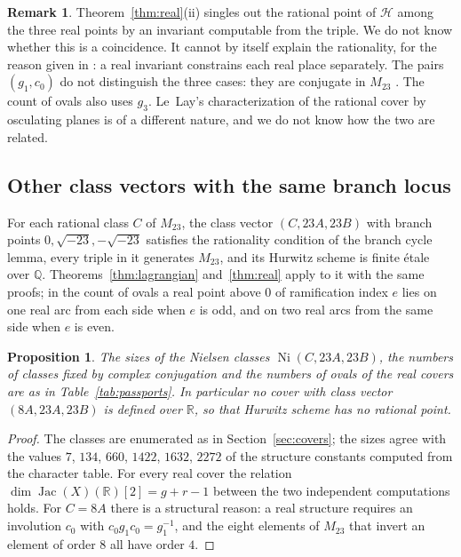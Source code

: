 \documentclass[11pt]{amsart}
\newtheorem{proposition}[theorem]{Proposition}
\theoremstyle{definition}
\newtheorem{remark}[theorem]{Remark}
\newcommand{\QQ}{\mathbb{Q}}
\newcommand{\RR}{\mathbb{R}}
\newcommand{\Jac}{\operatorname{Jac}}
\newcommand{\Ni}{\operatorname{Ni}}
\newcommand{\M}{M_{23}}
\newcommand{\cH}{\mathcal{H}}
\begin{document}
\begin{remark}
Theorem~\ref{thm:real}(ii) singles out the rational point of $\cH$ among the three real points by an invariant computable from the triple. We do not know whether this is a coincidence. It cannot by itself explain the rationality, for the reason given in \cite[\S6]{Janik26}: a real invariant constrains each real place separately. The pairs $(g_1,c_0)$ do not distinguish the three cases: they are conjugate in $\M$ \cite[Prop.~8.21]{LeLay26}. The count of ovals also uses $g_3$. Le~Lay's characterization of the rational cover by osculating planes \cite[Thm.~1.1]{LeLay26} is of a different nature, and we do not know how the two are related.
\end{remark}

\subsection{Other class vectors with the same branch locus}\label{ssec:passports}
For each rational class $C$ of $\M$, the class vector $(C,23A,23B)$ with branch points $0,\sqrt{-23},-\sqrt{-23}$ satisfies the rationality condition of the branch cycle lemma, every triple in it generates $\M$, and its Hurwitz scheme is finite \'etale over $\QQ$. Theorems~\ref{thm:lagrangian} and~\ref{thm:real} apply to it with the same proofs; in the count of ovals a real point above $0$ of ramification index $e$ lies on one real arc from each side when $e$ is odd, and on two real arcs from the same side when $e$ is even.



\begin{proposition}\label{prop:passports}
The sizes of the Nielsen classes $\Ni(C,23A,23B)$, the numbers of classes fixed by complex conjugation and the numbers of ovals of the real covers are as in Table~\ref{tab:passports}. In particular no cover with class vector $(8A,23A,23B)$ is defined over $\RR$, so that Hurwitz scheme has no rational point.
\end{proposition}
\begin{proof}
The classes are enumerated as in Section~\ref{sec:covers}; the sizes agree with the values $7$, $134$, $660$, $1422$, $1632$, $2272$ of the structure constants computed from the character table. For every real cover the relation $\dim\Jac(X)(\RR)[2]=g+r-1$ between the two independent computations holds. For $C=8A$ there is a structural reason: a real structure requires an involution $c_0$ with $c_0g_1c_0=g_1^{-1}$, and the eight elements of $\M$ that invert an element of order $8$ all have order $4$.
\end{proof}
\end{document}
